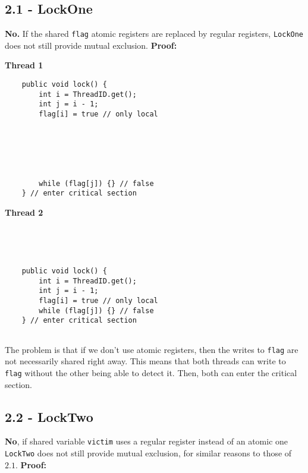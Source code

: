\documentclass[11pt, letterpaper]{article}
\newcommand{\code}[1] { \texttt{#1} }
\begin{document}
\subsection*{2.1 - LockOne}
\label{sub:2_1_lockone}

\textbf{No.} If the shared \code{flag} atomic registers are replaced by regular registers, \code{LockOne} does not still provide mutual exclusion. \textbf{Proof:}

\begin{figure*}[h!]
    \begin{minipage}{0.5\textwidth}
        \centering
        \textbf{Thread 1}
        \begin{verbatim}
    public void lock() {
        int i = ThreadID.get();
        int j = i - 1;
        flag[i] = true // only local






        while (flag[j]) {} // false
    } // enter critical section
        \end{verbatim}
    \end{minipage}
    \hspace{.5cm}
    \begin{minipage}{0.5\textwidth}
        \centering
        \textbf{Thread 2}
        \begin{verbatim}




    public void lock() {
        int i = ThreadID.get();
        int j = i - 1;
        flag[i] = true // only local
        while (flag[j]) {} // false
    } // enter critical section


        \end{verbatim}
    \end{minipage}
\end{figure*}

The problem is that if we don't use atomic registers, then the writes to \code{flag} are not necessarily shared right away. This means that both threads can write to \code{flag} without the other being able to detect it. Then, both can enter the critical section.

\subsection*{2.2 - LockTwo}
\label{sub:2_2_locktwo}

\textbf{No}, if shared variable \code{victim} uses a regular register instead of an atomic one \code{LockTwo} does not still provide mutual exclusion, for similar reasons to those of $2.1$. \textbf{Proof:}
\end{document}

